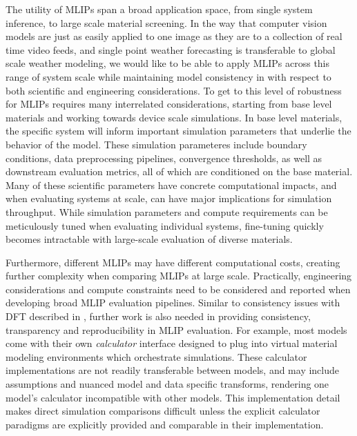 The utility of MLIPs span a broad application space, from single system inference, to large scale material screening. In the way that computer vision models are just as easily applied to one image as they are to a collection of real time video feeds, and single point weather forecasting is transferable to global scale weather modeling, we would like to be able to apply MLIPs across this range of system scale while maintaining model consistency in with respect to both scientific and engineering considerations. To get to this level of robustness for MLIPs requires many interrelated considerations, starting from base level materials and working towards device scale simulations. In base level materials, the specific system will inform important simulation parameters that underlie the behavior of the model. These simulation parameteres include boundary conditions, data preprocessing pipelines, convergence thresholds, as well as downstream evaluation metrics, all of which are conditioned on the base material. Many of these scientific parameters have concrete computational impacts, and when evaluating systems at scale, can have major implications for simulation throughput. While simulation parameters and compute requirements can be meticulously tuned when evaluating individual systems, fine-tuning quickly becomes intractable with large-scale evaluation of diverse materials. 

Furthermore, different MLIPs may have different computational costs, creating further complexity when comparing MLIPs at large scale. Practically, engineering considerations and compute constraints need to be considered and reported when developing broad MLIP evaluation pipelines. Similar to consistency issues with DFT described in , further work is also needed in providing consistency, transparency and reproducibility in MLIP evaluation. For example, most models come with their own \textit{calculator} interface designed to plug into virtual material modeling environments which orchestrate simulations. These calculator implementations are not readily transferable between models, and may include assumptions and nuanced model and data specific transforms, rendering one model's calculator incompatible with other models. This implementation detail makes direct simulation comparisons difficult unless the explicit calculator paradigms are explicitly provided and comparable in their implementation. 

